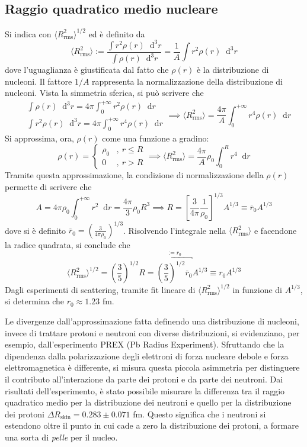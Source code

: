 \documentclass[11pt, a4paper]{scrartcl}
\theoremstyle{style}
\newcommand{\dd}{\mathop{}\!\mathrm{d}}
\numberwithin{equation}{subsection}
\begin{document}
\subsection{Raggio quadratico medio nucleare}

Si indica con $\langle R_\text{rms}^2 \rangle^{1/2}$ ed \`e definito da 
\[
\langle R_\text{rms}^2 \rangle := \frac{\int r^2 \rho (r) \dd ^3 r}{\int \rho (r) \dd ^3 r} = \frac{1}{A} \int r^2 \rho (r) \dd ^3 r
\] 
dove l'uguaglianza \`e giustificata dal fatto che $\rho (r)$ \`e la distribuzione di nucleoni. Il fattore $1 / A$ rappresenta la normalizzazione della distribuzione di nucleoni.
Vista la simmetria sferica, si pu\`o scrivere che
\[
\begin{split}
	&\int \rho (r) \dd ^3 r = 4 \pi \int _0 ^{+\infty} r^2 \rho (r) \dd r\\
	& \int r^2 \rho (r) \dd ^3 r = 4 \pi \int _0 ^{+\infty} r^4 \rho (r) \dd r
\end{split} \implies \langle R_\text{rms}^2 \rangle = \frac{4\pi}{ A} \int _0 ^{+\infty} r^4 \rho (r) \dd r
\] 
Si approssima, ora, $\rho (r)$ come una funzione a gradino:
\[
\rho (r) = \begin{cases}
	\rho _0 &,\ r\le R\\
	0 &,\ r > R
\end{cases}\implies  \langle R_\text{rms}^2 \rangle = \frac{4\pi }{A}\rho _0\int _0^R r^4 \dd r
\] 
Tramite questa approssimazione, la condizione di normalizzazione della $\rho (r)$ permette di scrivere che
\[
A = 4 \pi \rho _0 \int _0^{+\infty} r^2 \dd r = \frac{4\pi}{3} \rho _0 R^3 \implies R = \left[ \frac{3}{4 \pi} \frac{1}{\rho _0} \right] ^{1 / 3} A^{1/3} \equiv \overline{r}_0 A^{1 / 3}
\] 
dove si \`e definito $\overline{r}_0 = \left(\frac{3}{4 \pi \rho _0}\right) ^{1 / 3}$.
Risolvendo l'integrale nella $\langle R_\text{rms}^2 \rangle$ e facendone la radice quadrata, si conclude che
\[
	\langle R_\text{rms}^2 \rangle ^{1 / 2} = \left(\frac{3}{5}\right) ^{1 / 2} R = \overbracket{\left(\frac{3}{5}\right) ^{1 / 2} \overline{r}_0}^{:= r_0} A^{1 / 3} \equiv r_0 A^{1 / 3}
\] 
Dagli esperimenti di scattering, tramite fit lineare di $\langle R_\text{rms}^2 \rangle^{1 / 2}$ in funzione di $A^{1 / 3}$, si determina che $r_0 \approx 1.23$ fm.

Le divergenze dall'approssimazione fatta definendo una distribuzione di nucleoni, invece di trattare protoni e neutroni con diverse distribuzioni, si evidenziano, per esempio, dall'esperimento PREX (Pb Radius Experiment).
Sfruttando che la dipendenza dalla polarizzazione degli elettroni di forza nucleare debole e forza elettromagnetica \`e differente, si misura questa piccola asimmetria per distinguere il contributo all'interazione da parte dei protoni e da parte dei neutroni. 
Dai risultati dell'esperimento, \`e stato possibile misurare la differenza tra il raggio quadratico medio per la distribuzione dei neutroni e quello per la distribuzione dei protoni $\Delta R_\text{skin} = 0.283 \pm 0.071 $ fm.
Questo significa che i neutroni si estendono oltre il punto in cui cade a zero la distribuzione dei protoni, a formare una sorta di \textit{pelle} per il nucleo.
\end{document}
